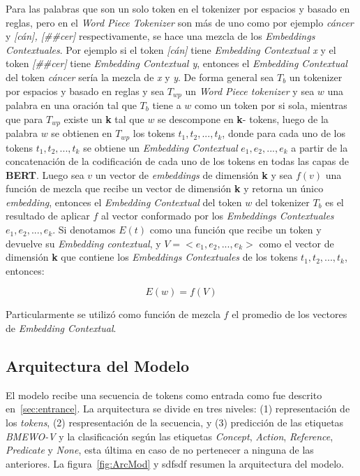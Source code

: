 Para las palabras que son un solo token en el tokenizer por espacios y basado en reglas, pero en el \emph{Word Piece Tokenizer} son m\'as de uno como por ejemplo \emph{c\'ancer} y \emph{[c\'an], [\#\#cer]} respectivamente, se hace una mezcla de los \emph{Embeddings Contextuales}. Por ejemplo si el token \emph{[c\'an]} tiene \emph{Embedding Contextual x} y el token \emph{[\#\#cer]} tiene \emph{Embedding Contextual y}, entonces el \emph{Embedding Contextual} del token \emph{c\'ancer} ser\'ia la mezcla de \emph{x} y \emph{y}. De forma general sea $T_b$ un tokenizer por espacios y basado en reglas y sea $T_{wp}$ un \emph{Word Piece tokenizer} y sea $w$ una palabra en una oraci\'on tal que $T_b$ tiene a $w$ como un token por si sola, mientras que para $T_{wp}$ existe un \textbf{k} tal que $w$ se descompone en \textbf{k}- tokens, luego de la palabra $w$ se obtienen en $T_{wp}$ los tokens $t_1, t_2, ..., t_k$, donde para cada uno de los tokens $t_1, t_2, ..., t_k$ se obtiene un \emph{Embedding Contextual} $e_1, e_2, ..., e_k$ a partir de la concatenaci\'on de la codificaci\'on de cada uno de los tokens en todas las capas de \textbf{BERT}. Luego sea $v$ un vector de \emph{embeddings} de dimensi\'on \textbf{k} y sea $f(v)$ una funci\'on de mezcla que recibe un vector de dimensi\'on \textbf{k} y retorna un \'unico \emph{embedding}, entonces el \emph{Embedding Contextual} del token $w$ del tokenizer $T_b$ es el resultado de aplicar $f$ al vector conformado por los \emph{Embeddings Contextuales} $e_1, e_2, ..., e_k$. Si denotamos $E(t)$ como una funci\'on que recibe un token y devuelve su \emph{Embedding contextual}, y $V = <e_1, e_2, ..., e_k>$ como el vector de dimensi\'on \textbf{k} que contiene los \emph{Embeddings Contextuales} de los tokens $t_1, t_2, ..., t_k$, entonces:

\begin{equation}
	E(w) = f(V)
\end{equation}

Particularmente se utiliz\'o como funci\'on de mezcla $f$ el promedio de los vectores de \emph{Embedding Contextual}.

\subsection{Arquitectura del Modelo}

El modelo recibe una secuencia de tokens como entrada como fue descrito en~\ref{sec:entrance}. La arquitectura se divide en tres niveles: (1) representaci\'on de los \emph{tokens}, (2) respresentaci\'on de la secuencia, y (3) predicci\'on de las etiquetas \emph{BMEWO-V} y la clasificaci\'on seg\'un las etiquetas \emph{Concept}, \emph{Action}, \emph{Reference}, \emph{Predicate} y \emph{None}, esta \'ultima en caso de no pertenecer a ninguna de las anteriores. La figura~\ref{fig:ArcMod} y sdfsdf resumen la arquitectura del modelo.


